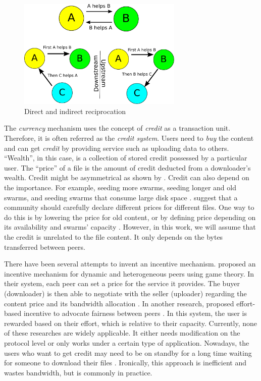 \begin{figure}[t]
	\centering
	\includegraphics[width=0.7\textwidth]{pics/reciprocation.pdf}
	\caption{Direct and indirect reciprocation}
	\label{fig:reciprocation}
\end{figure}

The \textit{currency} mechanism uses the concept of \textit{credit} as a transaction unit. Therefore, it is often referred as the \textit{credit system}. Users need to \textit{buy} the content and can get \textit{credit} by providing service such as uploading data to others. ``Wealth'', in this case, is a collection of stored credit possessed by a particular user. The ``price'' of a file is the amount of credit deducted from a downloader's wealth. Credit might be asymmetrical as shown by \citeauthor{2012:economicbt:kash}\cite{2012:economicbt:kash}. Credit can also depend on the importance. For example, seeding more swarms, seeding longer and old swarms, and seeding swarms that consume large disk space \cite{2014:sustainabilitytorrent:chen}. \citeauthor{2012:economicbt:kash} suggest that a community should carefully declare different prices for different files. One way to do this is by lowering the price for old content, or by defining price depending on its availability and swarms' capacity \cite{2012:economicbt:kash}. However, in this work, we will assume that the credit is unrelated to the file content. It only depends on the bytes transferred between peers.

There have been several attempts to invent an incentive mechanism. \citeauthor{2015:incentivep2pgame:kang} proposed an incentive mechanism for dynamic and heterogeneous peers using game theory. In their system, each peer can set a price for the service it provides. The buyer (downloader) is then able to negotiate with the seller (uploader) regarding the content price and its bandwidth allocation \cite{2015:incentivep2pgame:kang}. In another research, \citeauthor{2010:effortincentive:rahman} proposed effort-based incentive to advocate fairness between peers \cite{2010:effortincentive:rahman}. In this system, the user is rewarded based on their effort, which is relative to their capacity. Currently, none of these researches are widely applicable. It either needs modification on the protocol level or only works under a certain type of application. Nowadays, the users who want to get credit may need to be on standby for a long time waiting for someone to download their files \cite{2013:survivepriv:jia}. Ironically, this approach is inefficient and wastes bandwidth, but is commonly in practice\cite{2013:survivepriv:jia}.

